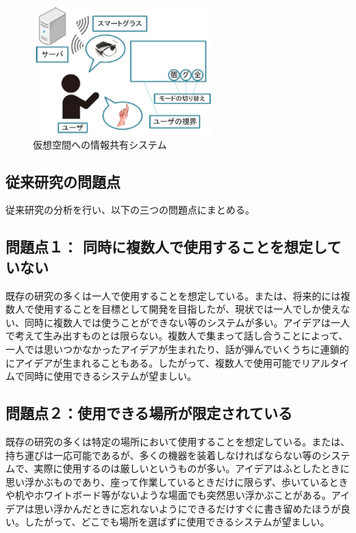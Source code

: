 \documentclass[11pt,a4j, titlepage]{jarticle} %
\begin{document}
\begin{figure}[H]
  \begin{center}
    \includegraphics[clip,height=5.0cm,width=7.0cm]{./kasoukuukan.eps}
    \caption{仮想空間への情報共有システム}
    \label{fig:kasoukuukan}
  \end{center}
\end{figure}

\subsection{従来研究の問題点}
従来研究の分析を行い、以下の三つの問題点にまとめる。

\subsection*{問題点１： 同時に複数人で使用することを想定していない}
既存の研究の多くは一人で使用することを想定している。または、将来的には複数人で使用することを目標として開発を目指したが、現状では一人でしか使えない、同時に複数人では使うことができない等のシステムが多い。アイデアは一人で考えて生み出すものとは限らない。複数人で集まって話し合うことによって、一人では思いつかなかったアイデアが生まれたり、話が弾んでいくうちに連鎖的にアイデアが生まれることもある。したがって、複数人で使用可能でリアルタイムで同時に使用できるシステムが望ましい。

\subsection*{問題点２：使用できる場所が限定されている}
既存の研究の多くは特定の場所において使用することを想定している。または、持ち運びは一応可能であるが、多くの機器を装着しなければならない等のシステムで、実際に使用するのは厳しいというものが多い。アイデアはふとしたときに思い浮かぶものであり、座って作業しているときだけに限らず、歩いているときや机やホワイトボード等がないような場面でも突然思い浮かぶことがある。アイデアは思い浮かんだときに忘れないようにできるだけすぐに書き留めたほうが良い。したがって、どこでも場所を選ばずに使用できるシステムが望ましい。
\end{document}
